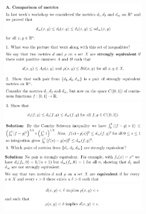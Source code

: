 \documentclass[8pt,landscape]{article}
\begin{document}
\begin{multicols}{3}
    \includegraphics[width=270]{086.png} \\
    \includegraphics[width=270]{087.png} \\
    \includegraphics[width=270]{088.png} \\
    \includegraphics[width=270]{089.png} \\
    \includegraphics[width=270]{090.png} \\
    \includegraphics[width=270]{091.png} \\
    \includegraphics[width=270]{092.png} \\

\end{multicols}
\end{document}
